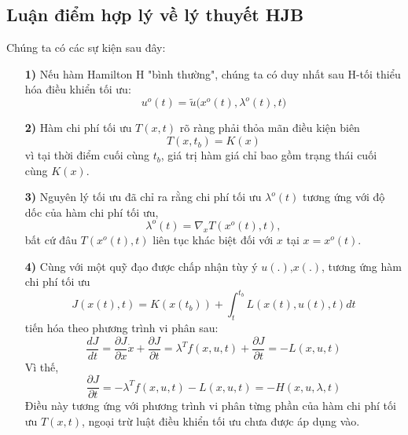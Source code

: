 \documentclass[12pt,a4paper]{report}
\begin{document}
		\subsection{Luận điểm hợp lý về lý thuyết HJB}
		Chúng ta có các sự kiện sau đây:
		\begin{enumerate}
			\item [\textbf{1)}] Nếu hàm Hamilton H "bình thường", chúng ta có duy nhất sau
			H-tối thiểu hóa điều khiển tối ưu: $$u^o(t) = \tilde{u}\big(x^o(t), \lambda^o(t), t\big)$$ 
			\item [\textbf{2)}] Hàm chi phí tối ưu $T(x, t)$ rõ ràng phải thỏa mãn điều kiện biên $$T(x, t_b) = K(x)$$ vì tại thời điểm cuối cùng $t_b$, giá trị hàm giá chỉ bao gồm trạng thái cuối cùng $K(x)$.\item[\textbf{3)}] Nguyên lý tối ưu đã chỉ ra rằng chi phí tối ưu $\lambda^o(t)$ tương ứng với độ dốc của hàm chi phí tối ưu, $$\lambda^o(t) = \nabla_xT(x^o(t),t), $$ bất cứ đâu $T(x^o(t), t)$ liên tục khác biệt đối với $x$ tại $x = x^o(t)$.
			\item [\textbf{4)}] Cùng với một quỹ đạo được chấp nhận tùy ý $u(.)$,$x(.)$, tương ứng
			hàm chi phí tối ưu $$J(x(t), t) = K(x(t_b)) + \int_{t}^{t_b}L(x(t), u(t), t)dt$$ tiến hóa theo phương trình vi phân sau: $$\frac{dJ}{dt} = \frac{\partial J}{\partial x}\dot{x} + \frac{\partial J}{\partial t} = \lambda^Tf(x, u, t) + \frac{\partial J}{\partial t} = -L(x, u, t)$$ Vì thế, $$\frac{\partial J}{\partial t} = -\lambda^Tf(x, u, t) - L(x, u, t) = -H(x, u, \lambda, t)$$ Điều này tương ứng với phương trình vi phân từng phần của hàm chi phí tối ưu $T(x, t)$, ngoại trừ luật điều khiển tối ưu chưa được áp dụng vào. 
		\end{enumerate}
\end{document}
